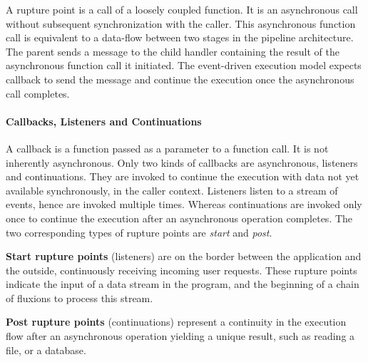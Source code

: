 A rupture point is a call of a loosely coupled function.
It is an asynchronous call without subsequent synchronization with the caller.
This asynchronous function call is equivalent to a data-flow between two stages in the pipeline architecture.
The parent sends a message to the child handler containing the result of the asynchronous function call it initiated.
The event-driven execution model expects callback to send the message and continue the execution once the asynchronous call completes.

\paragraph{Callbacks, Listeners and Continuations}

A callback is a function passed as a parameter to a function call.
It is not inherently asynchronous.
Only two kinds of callbacks are asynchronous, listeners and continuations.
They are invoked to continue the execution with data not yet available synchronously, in the caller context.
Listeners listen to a stream of events, hence are invoked multiple times.
Whereas continuations are invoked only once to continue the execution after an asynchronous operation completes.
The two corresponding types of rupture points are \textit{start} and \textit{post}.

\textbf{Start rupture points} (listeners) are on the border between the application and the outside, continuously receiving incoming user requests.
These rupture points indicate the input of a data stream in the program, and the beginning of a chain of fluxions to process this stream.

\textbf{Post rupture points} (continuations) represent a continuity in the execution flow after an asynchronous operation yielding a unique result, such as reading a file, or a database.





